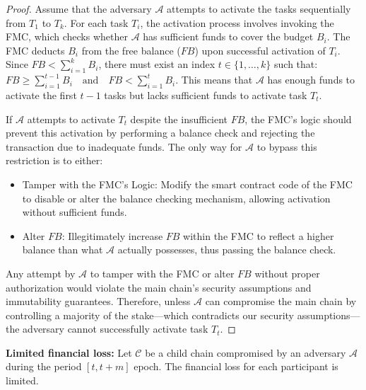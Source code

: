 \documentclass[10pt,journal]{IEEEtran}
\begin{document}
\begin{proof}

    Assume that the adversary $\mathcal{A}$ attempts to activate the tasks sequentially from $T_1$ to $T_k$. For each task $T_i$, the activation process involves invoking the FMC, which checks whether $\mathcal{A}$ has sufficient funds to cover the budget $B_i$. The FMC deducts $B_i$ from the free balance ($FB$) upon successful activation of $T_i$. Since $FB < \sum_{i=1}^k B_i$, there must exist an index $t \in \{1, \dots, k\}$ such that: $FB \geq \sum_{i=1}^{t-1} B_i \quad \text{and} \quad FB < \sum_{i=1}^t B_i.$ This means that $\mathcal{A}$ has enough funds to activate the first $t-1$ tasks but lacks sufficient funds to activate task $T_t$.

    If $\mathcal{A}$ attempts to activate $T_t$ despite the insufficient $FB$, the FMC's logic should prevent this activation by performing a balance check and rejecting the transaction due to inadequate funds. The only way for $\mathcal{A}$ to bypass this restriction is to either:
    \begin{itemize}
        \item Tamper with the FMC's Logic: Modify the smart contract code of the FMC to disable or alter the balance checking mechanism, allowing activation without sufficient funds.
        \item Alter $FB$: Illegitimately increase $FB$ within the FMC to reflect a higher balance than what $\mathcal{A}$ actually possesses, thus passing the balance check.
    \end{itemize}

Any attempt by $\mathcal{A}$ to tamper with the FMC or alter $FB$ without proper authorization would violate the main chain's security assumptions and immutability guarantees. Therefore, unless $\mathcal{A}$ can compromise the main chain by controlling a majority of the stake—which contradicts our security assumptions—the adversary cannot successfully activate task $T_t$.

\end{proof}

\noindent\textbf{Limited financial loss:}
    Let $\mathcal{C}$ be a child chain compromised by an adversary $\mathcal{A}$ during the period $[t, t + m ]$ epoch. 
    The financial loss for each participant is limited. 
 
\end{document}
